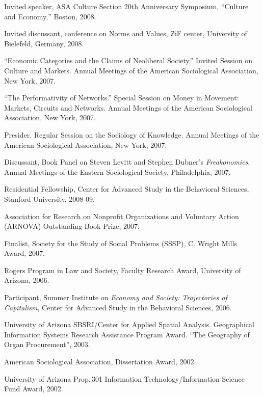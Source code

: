 \documentclass[11pt,oneside,a4paper,DIV=8]{scrartcl}
\renewcommand*{\section}[1]{\bigskip\marginnote{\sffamily\footnotesize\raggedright{#1}}\par}
\begin{document}
Invited speaker, ASA Culture Section 20th Anniversary Symposium, ``Culture and Economy,'' Boston, 2008.

Invited discussant, conference on Norms and Values, ZiF center, University of Bielefeld, Germany, 2008. 

``Economic Categories and the Claims of Neoliberal Society.'' Invited Session on Culture and Markets. Annual Meetings of the American Sociological Association, New York, 2007.

``The Performativity of Networks.'' Special Session on Money in Movement: Markets, Circuits and Networks. Annual Meetings of the American Sociological Association, New York, 2007.

Presider, Regular Session on the Sociology of Knowledge. Annual Meetings of the American Sociological Association, New York, 2007. 

Discussant, Book Panel on Steven Levitt and Stephen Dubner's \emph{Freakonomics}. Annual Meetings of the Eastern Sociological Society, Philadelphia, 2007. 

 

\section{grants,\\ honors, \\ \& awards}


Residential Fellowship, Center for Advanced Study in the Behavioral Sciences, Stanford University, 2008-09.

Association for Research on Nonprofit Organizations and Voluntary Action (ARNOVA) Outstanding Book Prize, 2007.

Finalist, Society for the Study of Social Problems (SSSP), C. Wright Mills Award, 2007.

Rogers Program in Law and Society, Faculty Research Award, University of Arizona, 2006.

Participant, Summer Institute on \emph{Economy and Society: Trajectories of Capitalism}, Center for Advanced Study in the Behavioral Sciences, 2006.

University of Arizona SBSRI/Center for Applied Spatial
Analysis. Geographical Information Systems Research Assistance
Program Award. ``The Geography of Organ Procurement'', 2003.

American Sociological Association, Dissertation Award, 2002.

University of Arizona Prop.\,301 Information Technology/Information Science Fund Award, 2002.
\end{document}
